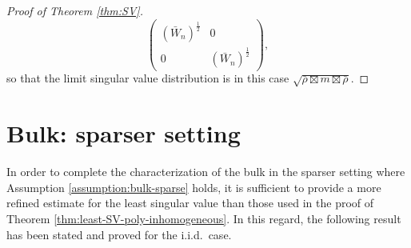\documentclass[11pt,oneside]{amsart}
\theoremstyle{plain}
\numberwithin{equation}{section}
\newcommand{\iid}{{i.i.d.~}}
\begin{document}
\begin{proof}[Proof of Theorem \ref{thm:SV}]
\begin{equation}
        \begin{pmatrix} (\bar{W}_n)^{\frac12} & 0  \\ 0 & (\bar{W}_n)^{\frac12}  \end{pmatrix}
        ,
\end{equation}
so that the limit singular value distribution is in this case $\sqrt{\bar \rho \boxtimes m \boxtimes \bar \rho }$.
\end{proof}

\section{Bulk: sparser setting}
\label{sec:sparse}

In order to complete the characterization of the bulk in the sparser setting where Assumption \ref{assumption:bulk-sparse} holds, it is sufficient to provide a more refined estimate for the least singular value than those used in the proof of Theorem \ref{thm:least-SV-poly-inhomogeneous}.
In this regard, the following result has been stated and proved for the \iid case.
\end{document}
